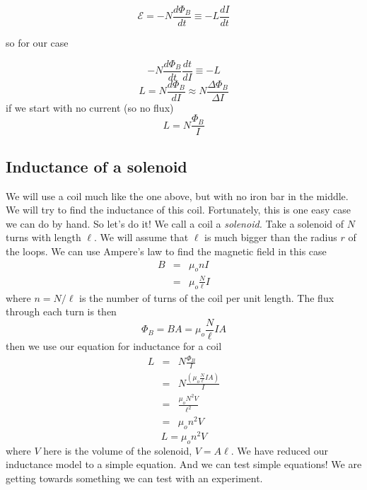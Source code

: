 \begin{equation*}
	\mathcal{E}=-N\frac{d\Phi _{B}}{dt}\equiv -L\frac{dI}{dt}
\end{equation*}

\noindent so for our case

\begin{equation*}
	-N\frac{d\Phi _{B}}{dt}\frac{dt}{dI}\equiv -L
\end{equation*}
\begin{equation*}
	L=N\frac{d\Phi _{B}}{dI} \approx N\frac{\Delta \Phi _{B}}{\Delta I}
\end{equation*}
if we start with no current (so no flux)%
\begin{equation*}
	L=N\frac{\Phi _{B}}{I}
\end{equation*}

\subsection{Inductance of a solenoid}

We will use a coil much like the one above, but with no iron bar in the middle. We will try to find the inductance of this coil. Fortunately, this is one easy case we can do by hand. So let's do it! We call a coil a \emph{solenoid.} Take a solenoid of $N$ turns with length $\ell .$ We will assume that $\ell $ is much bigger than the radius $r$ of the loops. We can use Ampere's law to find the magnetic field in this case 
\begin{eqnarray*}
	B &=&\mu _{o}nI \\
	  &=&\mu _{o}\frac{N}{\ell }I
\end{eqnarray*}
where $n=N/\ell $ is the number of turns of the coil per unit length. The flux through each turn is then 
\begin{equation*}
	\Phi _{B}=BA=\mu _{o}\frac{N}{\ell }IA
\end{equation*}
then we use our equation for inductance for a coil
\begin{eqnarray*}
	L &=&N\frac{\Phi _{B}}{I} \\
	  &=&N\frac{\left( \mu _{o}\frac{N}{\ell }IA\right) }{I} \\
	  &=&\frac{\mu _{o}N^{2}V}{\ell ^{2}} \\
	  &=&\mu _{o}n^{2}V
\end{eqnarray*}
\begin{equation}
	L=\mu _{o}n^{2}V  \label{Solenoid Inductance}
\end{equation}
where $V$ here is the volume of the solenoid, $V=A\ell .$ We have reduced our inductance model to a simple equation. And we can test simple equations! We are getting towards something we can test with an experiment.


